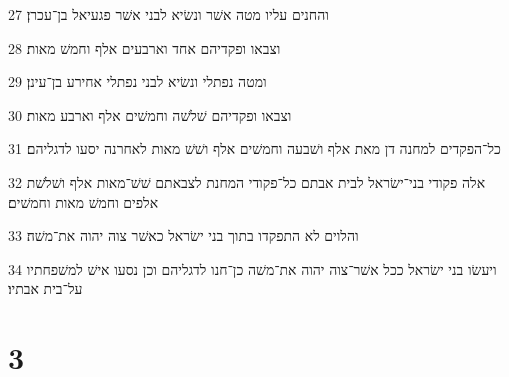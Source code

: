 \par 27 והחנים עליו מטה אשׁר ונשׂיא לבני אשׁר פגעיאל בן־עכרן׃
\par 28 וצבאו ופקדיהם אחד וארבעים אלף וחמשׁ מאות׃
\par 29 ומטה נפתלי ונשׂיא לבני נפתלי אחירע בן־עינן׃
\par 30 וצבאו ופקדיהם שׁלשׁה וחמשׁים אלף וארבע מאות׃
\par 31 כל־הפקדים למחנה דן מאת אלף ושׁבעה וחמשׁים אלף ושׁשׁ מאות לאחרנה יסעו לדגליהם׃
\par 32 אלה פקודי בני־ישׂראל לבית אבתם כל־פקודי המחנת לצבאתם שׁשׁ־מאות אלף ושׁלשׁת אלפים וחמשׁ מאות וחמשׁים׃
\par 33 והלוים לא התפקדו בתוך בני ישׂראל כאשׁר צוה יהוה את־משׁה׃
\par 34 ויעשׂו בני ישׂראל ככל אשׁר־צוה יהוה את־משׁה כן־חנו לדגליהם וכן נסעו אישׁ למשׁפחתיו על־בית אבתיו׃

\chapter{3}

